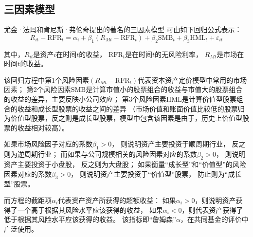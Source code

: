 \documentclass[UTF8]{ctexart}
\begin{document}
\subsection{三因素模型}

尤金·法玛和肯尼斯·弗伦奇提出的著名的三因素模型
可由如下回归公式表示：
\begin{equation}
  R_{it}-\mathrm{RFR}_t=\alpha _i+\beta _1\left( R_{Mt}-\mathrm{RFR}_t \right) +\beta _2\mathrm{SMB}_t+\beta _3\mathrm{HML}_t+\varepsilon _{it}
\end{equation}

其中，$R_{it}$是资产$i$在时间$t$的收益，
$\mathrm{RFR}_t$是在时间$t$的无风险利率，
$R_{Mt}$是市场在时间t的收益。

该回归方程中第1个风险因素$(R_{Mt}-\mathrm{RFR}_t)$代表资本资产定价模型中常用的市场因素；
第2个风险因素$\mathrm{SMB}$是计算市值小的股票组合的收益与市值大的股票组合的收益的差异，主要反映小公司效应；
第3个风险因素$\mathrm{HML}$是计算价值型股票组合的收益和成长型股票的收益之间的差异
（市场价值和账面价值比较低的股票归为价值型股票，反之则是成长型股票，模型中包含该因素是由于，历史上价值型股票的收益相对较高）。

如果市场风险因子对应的系数$\beta_1>0$，
则说明资产主要投资于顺周期行业，
反之则为逆周期行业；
而如果与公司规模相关的风险因素对应的系数$\beta_2>0$，
则说明资产主要投资于小盘股，
反之则为大盘股；
如果衡量“成长型”和“价值型”的风险因素对应的系数$\beta_3>0$，
则说明资产主要投资于“价值型”股票，
防止则为“成长型”股票。



而方程的截距项$\alpha_i$代表资产资产所获得的超额收益：
如果$\alpha_i>0$，则说明资产获得了一个高于根据其风险水平应该获得的收益，
如果$\alpha_i<0$，则代表资产获得了低于根据其风险水平应该获得的收益。
该指标即“詹姆森”$\alpha$，在共同基金的评价中广泛使用。
\end{document}
